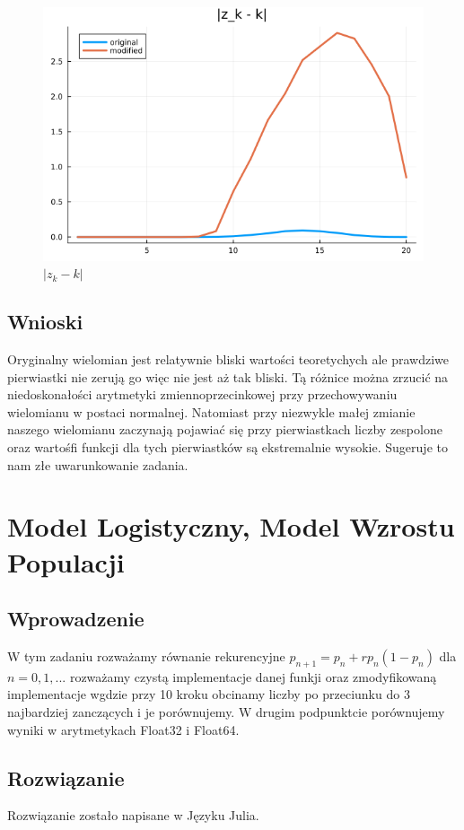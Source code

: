 \documentclass{article}
\begin{document}
    \begin{figure}[H]
        \centering
        \includegraphics[width=0.75\linewidth]{4.3.png}
        \caption{$|z_k - k|$}
        \label{fig:enter-label}
    \end{figure}
    \subsection{Wnioski}
    Oryginalny wielomian jest relatywnie bliski wartości teoretychych ale prawdziwe pierwiastki nie zerują go więc nie jest aż tak bliski. Tą różnice można zrzucić na niedoskonałości arytmetyki zmiennoprzecinkowej przy przechowywaniu wielomianu w postaci normalnej. Natomiast przy niezwykle małej zmianie naszego wielomianu zaczynają pojawiać się przy pierwiastkach liczby zespolone oraz wartośfi funkcji dla tych pierwiastków są ekstremalnie wysokie. Sugeruje to nam złe uwarunkowanie zadania.
\section{Model Logistyczny, Model Wzrostu Populacji}
    \subsection{Wprowadzenie}
    W tym zadaniu rozważamy równanie rekurencyjne
    $p_{n+1} = p_n + rp_n(1 - p_n)$ dla $n = 0,1,...$ rozważamy czystą implementacje danej funkji oraz zmodyfikowaną implementacje wgdzie przy 10 kroku obcinamy liczby po przeciunku do 3 najbardziej zanczących i je porównujemy. W drugim podpunktcie porównujemy wyniki w arytmetykach Float32 i Float64.
    \subsection{Rozwiązanie}
    Rozwiązanie zostało napisane w Języku Julia.
\end{document}
